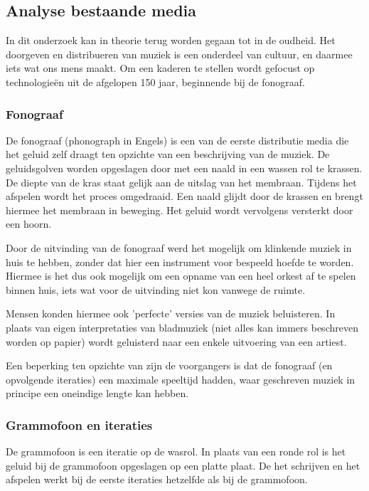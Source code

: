 \subsection{Analyse bestaande media}
In dit onderzoek kan in theorie terug worden gegaan tot in de oudheid. Het doorgeven en distribueren van muziek is een onderdeel van cultuur, en daarmee iets wat ons mens maakt. Om een kaderen te stellen wordt gefocust op technologieën uit de afgelopen 150 jaar, beginnende bij de fonograaf.

\subsubsection*{Fonograaf}
De fonograaf (phonograph in Engels) is een van de eerste distributie media die het geluid zelf draagt ten opzichte van een beschrijving van de muziek. De geluidsgolven worden opgeslagen door met een naald in een wassen rol te krassen. De diepte van de kras staat gelijk aan de uitslag van het membraan. Tijdens het afspelen wordt het proces omgedraaid. Een naald glijdt door de krassen en brengt hiermee het membraan in beweging. Het geluid wordt vervolgens versterkt door een hoorn.

Door de uitvinding van de fonograaf werd het mogelijk om klinkende muziek in huis te hebben, zonder dat hier een instrument voor bespeeld hoefde te worden. Hiermee is het dus ook mogelijk om een opname van een heel orkest af te spelen binnen huis, iets wat voor de uitvinding niet kon vanwege de ruimte.

Mensen konden hiermee ook 'perfecte' versies van de muziek beluisteren. In plaats van eigen interpretaties van bladmuziek (niet alles kan immers beschreven worden op papier) wordt geluisterd naar een enkele uitvoering van een artiest.

Een beperking ten opzichte van zijn de voorgangers is dat de fonograaf (en opvolgende iteraties) een maximale speeltijd hadden, waar geschreven muziek in principe een oneindige lengte kan hebben. 


\subsubsection*{Grammofoon en iteraties}
De grammofoon is een iteratie op de wasrol. In plaats van een ronde rol is het geluid bij de grammofoon opgeslagen op een platte plaat. De het schrijven en het afspelen werkt bij de eerste iteraties hetzelfde als bij de grammofoon.

